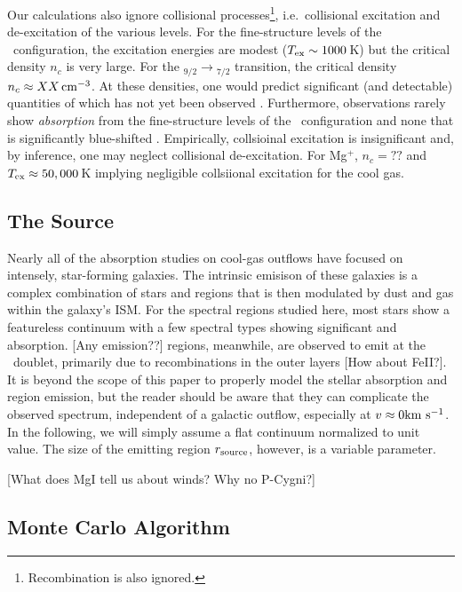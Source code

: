 \documentclass[12pt,preprint]{aastex}
\begin{document}
Our calculations also ignore collisional
processes\footnote{Recombination is also ignored.}, i.e.\ collisional
excitation and de-excitation of the various levels.  For the
fine-structure levels of the \aconfig\ configuration, the excitation
energies are modest ($T_{\rm ex} \sim 1000$\,K) but the critical
density $n_c$ is very large.  For the \aconfig$_{9/2} \to
$\aconfig$_{7/2}$ transition, the critical density $n_c \approx XX
\, {\rm cm^{-3}}$.  At these densities, one would predict significant (and
detectable) quantities of  which has not yet been observed
\citep[see also][]{pcb06}.  Furthermore, observations rarely show
{\it absorption} from the
fine-structure levels of the \aconfig\ configuration and  none that is
significantly blue-shifted \citep{rubin+10}.
Empirically, collsioinal excitation is insignificant and, by
inference, one may neglect collisional de-excitation.  
For Mg$^+$, $n_c = ??$ and $T_{\rm ex} \approx 50,000$\,K  
implying negligible collsiional excitation for the cool gas.  

\subsection{The Source}

Nearly all of the absorption studies on cool-gas outflows 
have focused on intensely, star-forming galaxies.  The
intrinsic emisison of these galaxies is a complex combination of
stars and  regions that is then modulated by dust and gas
within the galaxy's ISM.  For the spectral regions studied
here, most stars show a featureless continuum with a few spectral
types showing significant  and  absorption.
[Any emission??]   regions, meanwhile, are observed to emit
at the \mgiid\ doublet, primarily due to recombinations in the outer
layers [How about FeII?].  It is beyond the scope of this paper to
properly model the 
stellar absorption and  region emission, but the reader
should be aware that they can complicate the observed spectrum,
independent of a galactic outflow, especially at $v \approx 0 {\rm km~s^{-1}}$.
In the following, we will simply assume a flat continuum 
normalized to unit value.  The size of the emitting
region $r_{\rm source}$, however, is a variable parameter.

[What does MgI tell us about winds?  Why no P-Cygni?]

\subsection{Monte Carlo Algorithm}
\end{document}
